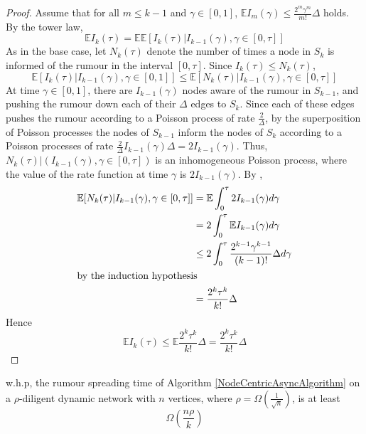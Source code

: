 \begin{proof}
	Assume that for all $m \leq k - 1$ and $\gamma \in [0,1]$, $\mathbb{E}I_m(\gamma) \leq \frac{2^m \gamma^m}{m!}\Delta$ holds.
	By the tower law,
	$$
		\mathbb{E}I_k(\tau) = \mathbb{E}\mathbb{E}[I_k(\tau) |I_{k-1}(\gamma), \gamma \in [0, \tau]] %
	$$
	As in the base case, let $N_k(\tau)$ denote the number of times a node in $S_k$ is informed of the rumour in the interval $[0, \tau]$. Since $I_k(\tau) \leq N_k(\tau)$,
	$$
		\mathbb{E}[I_k(\tau) |I_{k-1}(\gamma), \gamma \in [0, 1]] \leq \mathbb{E}[N_k(\tau) |I_{k-1}(\gamma), \gamma \in [0, \tau]]
	$$
	At time $\gamma \in [0,1]$, there are $I_{k-1}(\gamma)$ nodes aware of the rumour in $S_{k-1}$, and pushing the rumour down each of their $\Delta$ edges to $S_k$. Since each of these edges pushes the rumour according to a Poisson process of rate $\frac{2}{\Delta}$, by the superposition of Poisson processes the nodes of $S_{k-1}$ inform the nodes of $S_k$ according to a Poisson processes of rate $\frac{2}{\Delta}I_{k-1}(\gamma)\Delta = 2 I_{k-1}(\gamma)$.
	Thus, $N_k(\tau)|(I_{k-1}(\gamma), \gamma \in [0, \tau])$ is an inhomogeneous Poisson process, where the value of the rate function at time $\gamma$ is $2 I_{k-1}(\gamma)$. By %
	, 
	\begin{align*}
		\mathbb{E}[N_k(\tau)|I_{k-1}(\gamma), \gamma \in [0, \tau]] &= \mathbb{E}\int_0^\tau 2 I_{k-1}(\gamma) d\gamma \\
		&= 2 \int_0^\tau \mathbb{E}I_{k-1}(\gamma) d\gamma \\ %
		& \leq 2 \int_0^\tau \frac{2^{k-1} \gamma^{k-1}}{(k-1)!} \Delta d\gamma \\
		\intertext{by the induction hypothesis}
		& = \frac{2^k \tau^k}{k!} \Delta
	\end{align*}
	Hence 
	$$
		\mathbb{E}I_k(\tau) \leq \mathbb{E}\frac{2^k \tau^k}{k!}\Delta = \frac{2^k \tau^k}{k!}\Delta
	$$

\end{proof}


\begin{theorem}
	w.h.p, the rumour spreading time of Algorithm \ref{NodeCentricAsyncAlgorithm} on a $\rho$-diligent dynamic network with $n$ vertices, where $\rho = \Omega(\frac{1}{\sqrt{n}})$, is at least 
	$$
		\Omega\left(\frac{n \rho}{k}\right)
	$$
\end{theorem}

